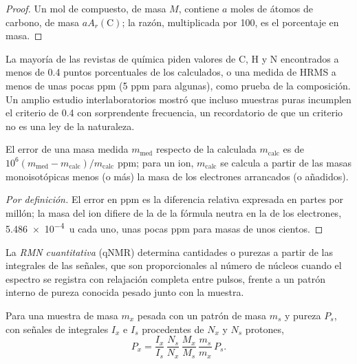 \begin{proof}
Un mol de compuesto, de masa $M$, contiene $a$ moles de átomos de carbono, de masa $aA_r(\mathrm C)$;
la razón, multiplicada por 100, es el porcentaje en masa.
\end{proof}

La mayoría de las revistas de química piden valores de C, H y N encontrados a menos de 0.4 puntos
porcentuales de los calculados, o una medida de HRMS a menos de unas pocas ppm (5 ppm
para algunas), como prueba de la composición. Un amplio estudio interlaboratorios mostró que
incluso muestras puras incumplen el criterio de 0.4 con sorprendente frecuencia, un recordatorio de que un
criterio no es una ley de la naturaleza.

\begin{proposition}\label{prop:b3:lab-techniques-3:ppm-error}
El error de una masa medida $m_{\mathrm{med}}$ respecto de la calculada $m_{\mathrm{calc}}$ es de
$10^6(m_{\mathrm{med}} - m_{\mathrm{calc}})/m_{\mathrm{calc}}$ ppm; para un ion, $m_{\mathrm{calc}}$ se calcula a partir de las masas monoisotópicas menos (o más) la
masa de los electrones arrancados (o añadidos).
\end{proposition}

\begin{proof}[Por definición]
El error en ppm es la diferencia relativa expresada en partes por millón; la
masa del ion difiere de la de la fórmula neutra en la de los electrones, \qty{5.486e-4}{u} cada uno, unas
pocas ppm para masas de unos cientos.
\end{proof}

\begin{definition}\label{def:b3:lab-techniques-3:qnmr}
La \emph{RMN cuantitativa} (qNMR) determina cantidades o
purezas a partir de las integrales de las señales, que son proporcionales al número de núcleos
cuando el espectro se registra con relajación completa entre pulsos, frente a un
patrón interno de pureza conocida pesado junto con la muestra.
\end{definition}

\begin{proposition}\label{prop:b3:lab-techniques-3:qnmr}
Para una muestra de masa $m_x$ pesada con un patrón de masa $m_s$ y pureza $P_s$, con señales
de integrales $I_x$ e $I_s$ procedentes de $N_x$ y $N_s$ protones,
\[
  P_x = \frac{I_x}{I_s}\,\frac{N_s}{N_x}\,\frac{M_x}{M_s}\,\frac{m_s}{m_x}\,P_s.
\]
\end{proposition}

